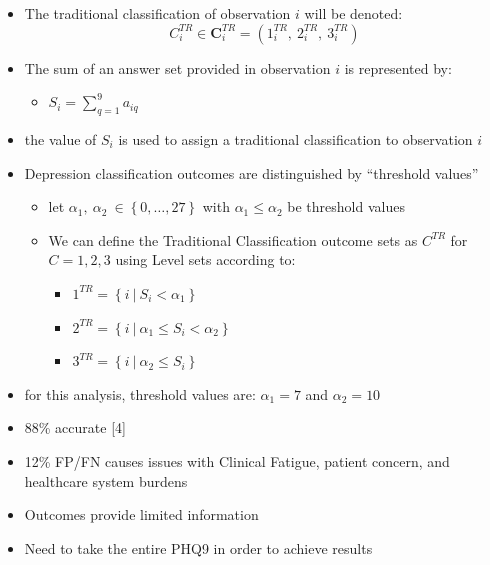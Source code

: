 \documentclass[12pt,]{article}
\providecommand{\tightlist}{%
  \setlength{\itemsep}{0pt}\setlength{\parskip}{0pt}}
\begin{document}
\begin{itemize}
\tightlist
\item
  The traditional classification of observation \(i\) will be denoted:
  \[C_{i}^{TR} \in \mathbf{C}_{i}^{TR}=\left(1_{i}^{TR}, \ 2_{i}^{TR}, \ 3_{i}^{TR} \right)\]
\item
  The sum of an answer set provided in observation \(i\) is represented
  by:

  \begin{itemize}
  \tightlist
  \item
    \(S_{i} = \sum_{q=1}^{9} a_{iq}\)
  \end{itemize}
\item
  the value of \(S_{i}\) is used to assign a traditional classification
  to observation \(i\)
\item
  Depression classification outcomes are distinguished by ``threshold
  values''

  \begin{itemize}
  \tightlist
  \item
    let
    \(\alpha_{1}, \ \alpha_{2} \ \in \left \{ 0, \ldots, 27 \right \}\)
    with \(\alpha_{1} \leq \alpha_{2}\) be threshold values
  \item
    We can define the Traditional Classification outcome sets as
    \(C^{TR}\) for \(C=1,2,3\) using Level sets according to:

    \begin{itemize}
    \tightlist
    \item
      \(1^{TR}=\left \{i \ \Big | \ S_{i} < \alpha_{1} \right \}\)
    \item
      \(2^{TR}=\left \{i \ \Big | \ \alpha_{1} \leq S_{i} < \alpha_{2} \right \}\)
    \item
      \(3^{TR}=\left \{i \ \Big | \ \alpha_{2} \leq S_{i} \right \}\)
    \end{itemize}
  \end{itemize}
\item
  for this analysis, threshold values are: \(\alpha_{1}=7\) and
  \(\alpha_{2}=10\)
\item
  88\% accurate {[}4{]}
\item
  12\% FP/FN causes issues with Clinical Fatigue, patient concern, and
  healthcare system burdens
\item
  Outcomes provide limited information
\item
  Need to take the entire PHQ9 in order to achieve results
\end{itemize}
\end{document}
